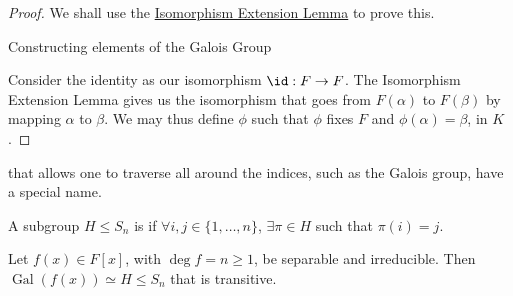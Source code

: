 \documentclass[notoc,notitlepage,nobib]{tufte-book}
\DeclareMathOperator{\Gal}{Gal}
\begin{document}
\begin{proof}
  We shall use the \hyperref[lemma:isomorphism_extension_lemma]{Isomorphism
  Extension Lemma} to prove this.
  \begin{marginfigure}
    \centering
    \caption{Constructing elements of the Galois Group}\label{fig:constructing_elements_of_the_galois_group}
  \end{marginfigure}
  Consider the identity as our isomorphism $\id : F \to F$. The Isomorphism
  Extension Lemma gives us the isomorphism that goes from $F(\alpha)$ to
  $F(\beta)$ by mapping $\alpha$ to $\beta$. We may thus define $\phi$ such that
  $\phi$ fixes $F$ and $\phi(\alpha) = \beta$, in $K$.
\end{proof}

 that allows one to traverse all around the
indices, such as the Galois group, have a special name.

\begin{defn}\label{defn:transitive_subgroup}
  A subgroup $H \leq S_n$ is  if $\forall i, j \in \{ 1,
  \ldots, n \}$, $\exists \pi \in H$ such that $\pi(i) = j$.
\end{defn}

\begin{crly}\label{crly:the_galois_group_of_a_separable_irreducible_polynomial_is_transitive}
  Let $f(x) \in F[x]$, with $\deg f = n \geq 1$, be separable and irreducible.
  Then $\Gal(f(x)) \simeq H \leq S_n$ that is transitive.
\end{crly}
\end{document}
